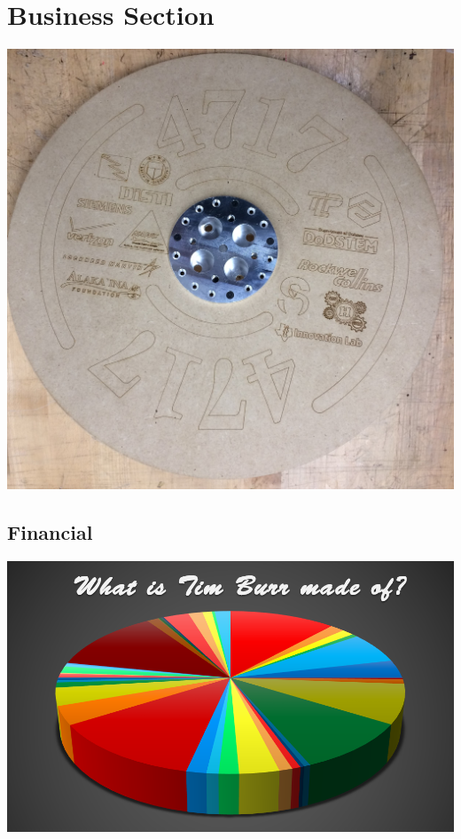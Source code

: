 \documentclass[
letterpaper, %
11pt, %
twoside,
onecolumn, %
openany, %
]{report}
\begin{document}
\cleardoublepage
\part{Business Section}
\vspace{3em}
\begin{minipage}[c]{\linewidth}
\centering
\includegraphics[width=\linewidth]{Images/Main/Big_wheel.JPG}
\end{minipage}



                                            
\chapter{Financial}
\vspace{3em}
\begin{minipage}[c]{\linewidth}
\centering
\includegraphics[width=\linewidth]{Images/Main/finance_cover_pic.png}
\end{minipage}
\end{document}
